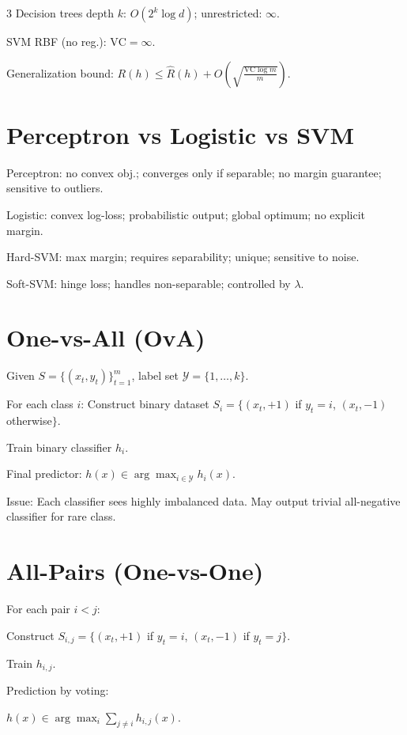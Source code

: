 \documentclass[8pt,fleqn]{extarticle}
\begin{document}
\begin{multicols}{3}
Decision trees depth $k$: $O(2^k\log d)$; unrestricted: $\infty$.

SVM RBF (no reg.): $\text{VC}=\infty$.

Generalization bound:
$R(h)\le\hat R(h)+O\!\left(\!\sqrt{\frac{\text{VC}\log m}{m}}\right)$.


\section*{Perceptron vs Logistic vs SVM}

Perceptron: no convex obj.; converges only if separable; no margin guarantee; sensitive to outliers.

Logistic: convex log-loss; probabilistic output; global optimum; no explicit margin.

Hard-SVM: max margin; requires separability; unique; sensitive to noise.

Soft-SVM: hinge loss; handles non-separable; controlled by $\lambda$.


\section*{One-vs-All (OvA)}

Given $S=\{(x_t,y_t)\}_{t=1}^m$, label set $\mathcal Y=\{1,\dots,k\}$.

For each class $i$:
Construct binary dataset
$S_i=\{(x_t, +1)$ if $y_t=i$, $(x_t,-1)$ otherwise$\}$.

Train binary classifier $h_i$.

Final predictor:
$h(x)\in \arg\max_{i\in\mathcal Y} h_i(x)$.

Issue:
Each classifier sees highly imbalanced data.
May output trivial all-negative classifier for rare class.


\section*{All-Pairs (One-vs-One)}

For each pair $i<j$:

Construct
$S_{i,j}=\{(x_t,+1)$ if $y_t=i$,
$(x_t,-1)$ if $y_t=j\}$.

Train $h_{i,j}$.

Prediction by voting:

$h(x)\in\arg\max_i \sum_{j\neq i} h_{i,j}(x)$.


\end{multicols}
\end{document}
